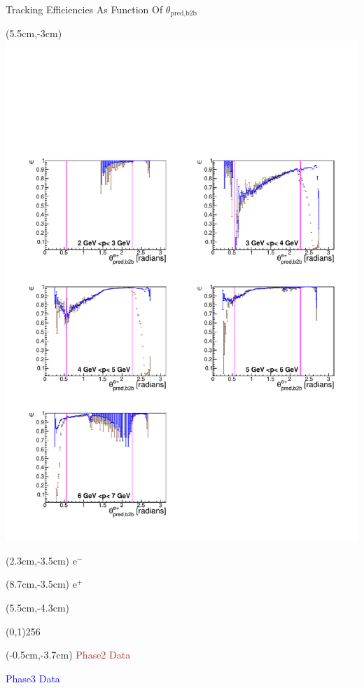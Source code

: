 \documentclass[8pt]{beamer}
\begin{document}
\begin{frame}{Tracking Efficiencies As Function Of $\theta_{\textrm{pred,b2b}}$}
\begin{textblock*}{6.5cm}(5.5cm,-3cm)
	\includegraphics[width=\textwidth]{VPlots/Comp/cMThetaep_Data}
\end{textblock*}


\begin{textblock*}{2cm}(2.3cm,-3.5cm)
	$\textrm{e}^-$
\end{textblock*}

\begin{textblock*}{2cm}(8.7cm,-3.5cm)
	$\textrm{e}^+$
\end{textblock*}



\begin{textblock*}{11cm}(5.5cm,-4.3cm)
	
	\begin{center}
		\line(0,1){256}
	\end{center}
	
\end{textblock*}


\begin{textblock*}{4cm}(-0.5cm,-3.7cm)
	\textcolor{brown}{Phase2 Data}
	
	\textcolor{blue}{Phase3 Data}
\end{textblock*}






\end{frame}
\end{document}
